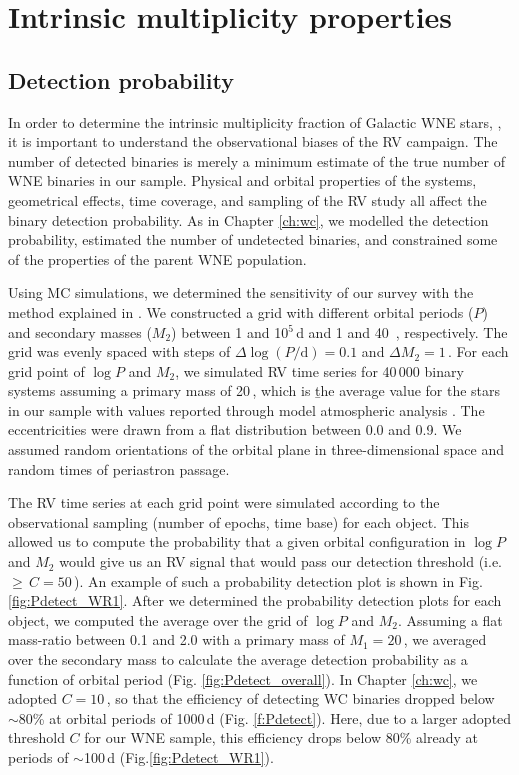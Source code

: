 \section{Intrinsic multiplicity properties}\label{sect:intbinfrac}
\subsection{Detection probability} \label{sect:detection_probability}
In order to determine the intrinsic multiplicity fraction of Galactic WNE stars, \fintWNE{}, it is important to understand the observational biases of the RV campaign. The number of detected binaries is merely a minimum estimate of the true number of  WNE binaries in our sample. Physical and orbital properties of the systems, geometrical effects, time coverage, and sampling of the RV study all affect the binary detection probability. As in Chapter \ref{ch:wc}, we modelled the detection probability, estimated the number of undetected binaries, and constrained some of the properties of the parent WNE population.

Using MC simulations, we determined the sensitivity of our survey with the method explained in \citet{2019Patrick}. We constructed a grid with different orbital periods ($P$) and secondary masses ($M_2$) between 1 and 10$^5$\,d and 1 and 40\,\Msun{} , respectively. The grid was evenly spaced with steps of $\Delta \log (P/\textrm{d}) = 0.1$ and $\Delta M_2 = 1$\,\Msun{}. For each grid point of $\log P$ and $M_2$, we simulated RV time series for 40\,000 binary systems assuming a primary mass of 20\,\Msun{}, which is \b{the average value for the stars in our sample with values reported through model atmospheric analysis} \citep{hamann_galactic_2019}. The eccentricities were drawn from a flat distribution between 0.0 and 0.9. We assumed random orientations of the orbital plane in three-dimensional space and random times of periastron passage.

The RV time series at each grid point were simulated according to the observational sampling (number of epochs, time base) for each object. This allowed us to compute the probability that a given orbital configuration in $\log P$ and $M_2$ would give us an RV signal that would pass our detection threshold (i.e. \DelRV{}\,$\ge\,C=50$\,\kms{}). An example of such a probability detection plot is shown in Fig. \ref{fig:Pdetect_WR1}. After we determined the probability detection plots for each object, we computed the average over the grid of $\log P$ and $M_2$. Assuming a flat mass-ratio between 0.1 and 2.0 with a primary mass of $M_1 = 20$\,\Msun{}, we averaged over the secondary mass to calculate the average detection probability as a function of orbital period (Fig. \ref{fig:Pdetect_overall}). In Chapter \ref{ch:wc}, we adopted $C=10\,$\kms{}, so that the efficiency of detecting WC binaries dropped below ${\sim}80$\% at orbital periods of 1000\,d (Fig. \ref{f:Pdetect}). Here, due to a larger adopted threshold $C$ for our WNE sample, this efficiency drops below 80\% already at periods of ${\sim}$100\,d (Fig.\ref{fig:Pdetect_WR1}).

